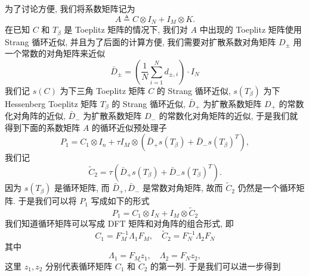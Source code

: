 \documentclass{ecnumaster}
\begin{document}
为了讨论方便, 我们将系数矩阵记为
\begin{equation}
  A \triangleq C \otimes I_N + I_M \otimes K.
\end{equation}
在已知 $C$ 和 $T_{\beta}$ 是 Toeplitz 矩阵的情况下,
我们对 $A$ 中出现的 Toeplitz 矩阵使用 Strang 循环近似,
并且为了后面的计算方便,
我们需要对扩散系数对角矩阵 $D_{\pm}$ 用一个常数的对角矩阵来近似
\begin{equation}\label{eq:Dpm-bar}
  \bar{D}_{\pm} = \left(\frac{1}{N} \sum_{i=1}^{N} d_{\pm,i}\right) \cdot I_N
\end{equation}
我们记 $s(C)$ 为下三角 Toeplitz 矩阵 $C$ 的 Strang 循环近似,
$s(T_{\beta})$ 为下 Hessenberg Toeplitz 矩阵 $T_{\beta}$ 的 Strang 循环近似,
$\bar{D}_+$ 为扩散系数矩阵 $D_+$ 的常数化对角阵的近似,
$\bar{D}_-$ 为扩散系数矩阵 $D_-$ 的常数化对角矩阵的近似,
于是我们就得到下面的系数矩阵 $A$ 的循环近似预处理子
\begin{equation}
  P_1 = C_1 \otimes I_n
  + \tau I_M \otimes (\bar{D}_+ s(T_{\beta}) + \bar{D}_- s(T_{\beta})^T),
\end{equation}
我们记
$$
  \tilde{C}_2 = \tau (\bar{D}_+ s(T_{\beta}) + \bar{D}_- s(T_{\beta})^T).
$$
因为 $s(T_{\beta})$ 是循环矩阵,
而 $\bar{D}_+, \bar{D}_-$ 是常数对角矩阵, 故而 $\tilde{C}_2$ 仍然是一个循环矩阵.
于是我们可以将 $P_1$ 写成如下的形式
\begin{equation}
    P_1 = C_1 \otimes I_N + I_M \otimes \tilde{C}_2
\end{equation}
我们知道循环矩阵可以写成 DFT 矩阵和对角阵的组合形式, 即
$$
  C_1 = F_M^{-1}\Lambda _1F_M, \quad \tilde{C}_2 = F_N^{-1}\Lambda _2F_N
$$
其中
$$
  \Lambda _1 = F_Mz_1, \quad \Lambda_2 = F_Nz_2,
$$
这里 $z_1, z_2$ 分别代表循环矩阵 $C_1$ 和 $\tilde{C}_2$ 的第一列.
于是我们可以进一步得到
\end{document}

